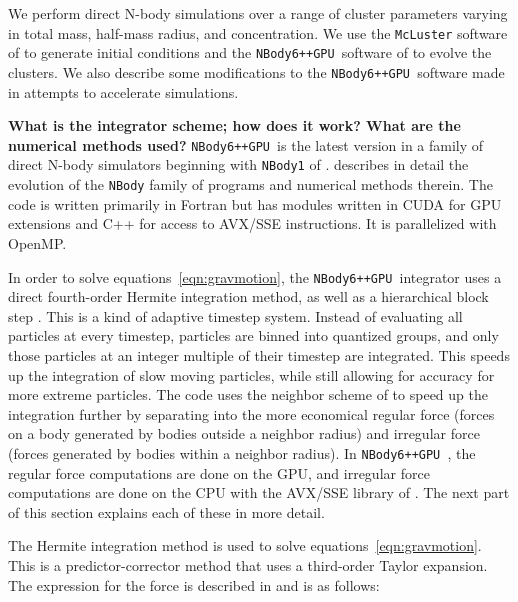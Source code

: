 \documentclass[preprint1]{aastex}
\newcommand\nbody{\texttt{NBody6++GPU }}
\numberwithin{equation}{section}
\begin{document}
We perform direct N-body simulations over a range of cluster parameters varying in total mass, half-mass radius, and concentration.  We use the \texttt{McLuster} software of \citet{2011Kupper} to generate initial conditions and the \nbody software of \citet{2015Wang} to evolve the clusters. We also describe some modifications to the \nbody software made in attempts to accelerate simulations.

\textbf{What is the integrator scheme; how does it work?  What are the numerical methods used?}
\nbody is the latest version in a family of direct N-body simulators beginning with \texttt{NBody1} of \citet{1963Aarseth}. \citet{1999Aarseth} describes in detail the evolution of the \texttt{NBody} family of programs and numerical methods therein.  The code is written primarily in Fortran but has modules written in CUDA for GPU extensions and C++ for access to AVX/SSE instructions. It is parallelized with OpenMP.

In order to solve equations~\ref{eqn:gravmotion}, the \nbody integrator uses a direct fourth-order Hermite integration method, as well as a hierarchical block step \citep[][and refs within]{2015Wang}. This is a kind of adaptive timestep system. Instead of evaluating all particles at every timestep, particles are binned into quantized groups, and only those particles at an integer multiple of their timestep are integrated. This speeds up the integration of slow moving particles, while still allowing for accuracy for more extreme particles. The code uses the neighbor scheme of \citet{1973Ahmad} to speed up the integration further by separating into the more economical regular force (forces on a body generated by bodies outside a neighbor radius) and irregular force (forces generated by bodies within a neighbor radius). In \nbody, the regular force computations are done on the GPU, and irregular force computations are done on the CPU with the AVX/SSE library of \citet{2012Nitadori}. The next part of this section explains each of these in more detail.

The Hermite integration method is used to solve equations~\ref{eqn:gravmotion}.  This is a predictor-corrector method that uses a third-order Taylor expansion.  The expression for the force is described in \citet{1999Aarseth} and is as follows:
\end{document}
